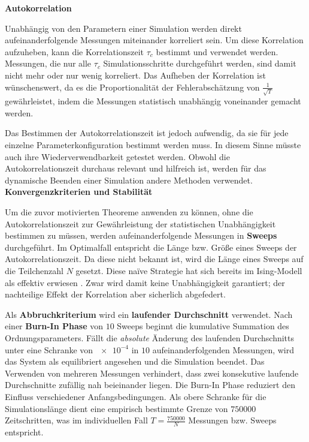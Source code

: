 \documentclass{solutionclass}
\begin{document}
\textbf{Autokorrelation}

Unabhängig von den Parametern einer Simulation werden direkt aufeinanderfolgende Messungen miteinander korreliert sein. Um diese Korrelation aufzuheben, kann die Korrelationszeit $\tau_c$ bestimmt und verwendet werden. Messungen, die nur alle $\tau_c$ Simulationsschritte durchgeführt werden, sind damit nicht mehr oder nur wenig korreliert. Das Aufheben der Korrelation ist wünschenswert, da es die Proportionalität der Fehlerabschätzung von $\tfrac{1}{\sqrt{T}}$ gewährleistet, indem die Messungen statistisch unabhängig voneinander gemacht werden.

Das Bestimmen der Autokorrelationszeit ist jedoch aufwendig, da sie für jede einzelne Parameterkonfiguration bestimmt werden muss. In diesem Sinne müsste auch ihre Wiederverwendbarkeit getestet werden. Obwohl die Autokorrelationszeit durchaus relevant und hilfreich ist, werden für das dynamische Beenden einer Simulation andere Methoden verwendet.\\

\textbf{Konvergenzkriterien und Stabilität}

Um die zuvor motivierten Theoreme anwenden zu können, ohne die Autokorrelationszeit zur Gewährleistung der statistischen Unabhängigkeit bestimmen zu müssen, werden aufeinanderfolgende Messungen in \textbf{Sweeps} durchgeführt. Im Optimalfall entspricht die Länge bzw. Größe eines Sweeps der Autokorrelationszeit. Da diese nicht bekannt ist, wird die Länge eines Sweeps auf die Teilchenzahl $N$ gesetzt. Diese na\"ive Strategie hat sich bereits im Ising-Modell als effektiv erwiesen \cite{Ising1925}. Zwar wird damit keine Unabhängigkeit garantiert; der nachteilige Effekt der Korrelation aber sicherlich abgefedert.

Als \textbf{Abbruchkriterium} wird ein \textbf{laufender Durchschnitt} verwendet. Nach einer \textbf{Burn-In Phase} von $\num{10}$ Sweeps beginnt die kumulative Summation des Ordnungsparameters. Fällt die \textit{absolute} Änderung des laufenden Durchschnitts unter eine Schranke von $\num{e-4}$ in $\num{10}$ aufeinanderfolgenden Messungen, wird das System als equilibriert angesehen und die Simulation beendet. Das Verwenden von mehreren Messungen verhindert, dass zwei konsekutive laufende Durchschnitte zufällig nah beieinander liegen. Die Burn-In Phase reduziert den Einfluss verschiedener Anfangsbedingungen. Als obere Schranke für die Simulationslänge dient eine empirisch bestimmte Grenze von $\num{750000}$ Zeitschritten, was im individuellen Fall $T = \tfrac{\num{750000}}{N}$ Messungen bzw. Sweeps entspricht.
\end{document}
